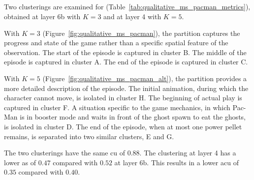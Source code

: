 \cleartoleftpage
\subsection{\MsPacManName}

Two clusterings are examined for \MsPacManName (Table~\ref{tab:qualitative_ms_pacman_metrics}), obtained at layer 6b with $K=3$ and at layer 4 with $K=5$.

With $K=3$ (Figure~\ref{fig:qualitative_ms_pacman}), the partition captures the progress and state of the game rather than a specific spatial feature of the observation.
The start of the episode is captured in cluster B.
The middle of the episode is captured in cluster A.
The end of the episode is captured in cluster C.

With $K=5$ (Figure~\ref{fig:qualitative_ms_pacman_alt}), the partition provides a more detailed description of the episode.
The initial animation, during which the character cannot move, is isolated in cluster H.
The beginning of actual play is captured in cluster F.
A situation specific to the game mechanics, in which Pac-Man is in booster mode and waits in front of the ghost spawn to eat the ghosts, is isolated in cluster D.
The end of the episode, when at most one power pellet remains, is separated into two similar clusters, E and G.

The two clusterings have the same \gls{cu} of $0.88$.
The clustering at layer 4 has a lower \gls{as} of $0.47$ compared with $0.52$ at layer 6b.
This results in a lower \gls{acu} of $0.35$ compared with $0.40$.

